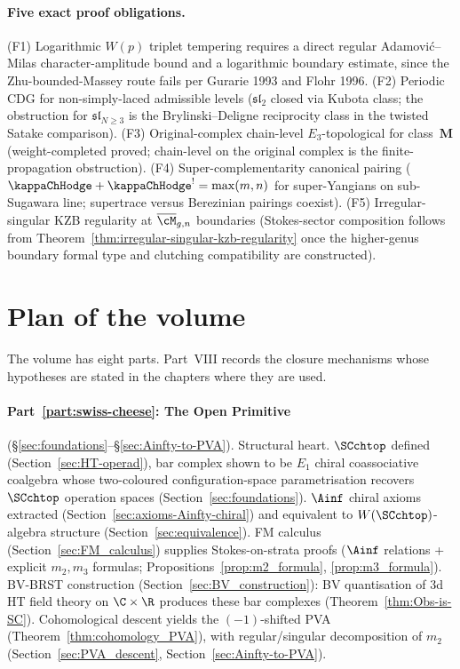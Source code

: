 \paragraph{Five exact proof obligations.}
(F1) Logarithmic $W(p)$ triplet tempering requires a direct
regular Adamovi\'c--Milas character-amplitude bound and a logarithmic
boundary estimate, since the Zhu-bounded-Massey route fails per
Gurarie 1993 and Flohr 1996.
(F2) Periodic CDG for non-simply-laced admissible levels
($\mathfrak{sl}_2$ closed via Kubota class; the obstruction for
$\mathfrak{sl}_{N \ge 3}$ is the Brylinski--Deligne reciprocity
class in the twisted Satake comparison).
(F3) Original-complex chain-level $E_3$-topological for
class~$\mathbf{M}$ (weight-completed proved; chain-level on
the original complex is the finite-propagation obstruction).
(F4) Super-complementarity canonical pairing
($\kappaChHodge + {\kappaChHodge}^! = \max(m,n)$ for
super-Yangians on sub-Sugawara line; supertrace versus Berezinian
pairings coexist).
(F5) Irregular-singular KZB regularity at $\overline{\cM}_{g,n}$
boundaries (Stokes-sector composition follows from
Theorem~\ref{thm:irregular-singular-kzb-regularity} once the
higher-genus boundary formal type and clutching compatibility are
constructed).

\section*{Plan of the volume}

The volume has eight parts. Part~VIII records the closure mechanisms
whose hypotheses are stated in the chapters where they are used.

\paragraph{Part~\ref{part:swiss-cheese}: The Open Primitive}
(\S\ref{sec:foundations}--\S\ref{sec:Ainfty-to-PVA}).
Structural heart. $\SCchtop$ defined
(Section~\ref{sec:HT-operad}), bar complex shown to be $E_1$
chiral coassociative coalgebra whose two-coloured
configuration-space parametrisation recovers $\SCchtop$
operation spaces (Section~\ref{sec:foundations}). $\Ainf$
chiral axioms extracted (Section~\ref{sec:axioms-Ainfty-chiral})
and equivalent to $W(\SCchtop)$-algebra structure
(Section~\ref{sec:equivalence}). FM calculus
(Section~\ref{sec:FM_calculus}) supplies Stokes-on-strata proofs
($\Ainf$ relations + explicit $m_2, m_3$ formulas;
Propositions~\ref{prop:m2_formula},
\ref{prop:m3_formula}). BV-BRST construction
(Section~\ref{sec:BV_construction}): BV quantisation of 3d HT
field theory on $\C \times \R$ produces these bar complexes
(Theorem~\ref{thm:Obs-is-SC}). Cohomological descent yields the
$(-1)$-shifted PVA (Theorem~\ref{thm:cohomology_PVA}), with
regular/singular decomposition of $m_2$
(Section~\ref{sec:PVA_descent},
Section~\ref{sec:Ainfty-to-PVA}).

